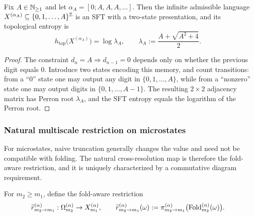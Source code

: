 \begin{proposition}\label{prop:metallic-two-state-sft}
Fix $A\in\mathbb{N}_{\ge 1}$ and let $\alpha_A=[0;A,A,A,\dots]$.
Then the infinite admissible language $X^{(\alpha_A)}\subseteq\{0,1,\dots,A\}^{\mathbb{Z}}$ is an SFT with a two-state presentation, and its topological entropy is
\[
h_{\mathrm{top}}\bigl(X^{(\alpha_A)}\bigr)=\log\lambda_A,
\qquad
\lambda_A:=\frac{A+\sqrt{A^2+4}}{2}.
\]
\end{proposition}
\begin{proof}
The constraint $d_n=A\Rightarrow d_{n-1}=0$ depends only on whether the previous digit equals $0$.
Introduce two states encoding this memory, and count transitions: from a ``$0$'' state one may output any digit in $\{0,1,\dots,A\}$, while from a ``nonzero'' state one may output digits in $\{0,1,\dots,A-1\}$.
The resulting $2\times 2$ adjacency matrix has Perron root $\lambda_A$, and the SFT entropy equals the logarithm of the Perron root.
\end{proof}

\subsubsection{Natural multiscale restriction on microstates}
For microstates, naive truncation generally changes the value and need not be compatible with folding.
The natural cross-resolution map is therefore the fold-aware restriction, and it is uniquely characterized by a commutative diagram requirement.

\begin{definition}\label{def:fold-ostrowski-restriction}
For $m_2\ge m_1$, define the fold-aware restriction
\[
\widetilde r^{(\alpha)}_{m_2\to m_1}:\Omega_{m_2}^{(\alpha)}\to X_{m_1}^{(\alpha)},
\qquad
\widetilde r^{(\alpha)}_{m_2\to m_1}(\omega):=\pi^{(\alpha)}_{m_2\to m_1}\bigl(\mathrm{Fold}_{m_2}^{(\alpha)}(\omega)\bigr).
\]
\end{definition}


